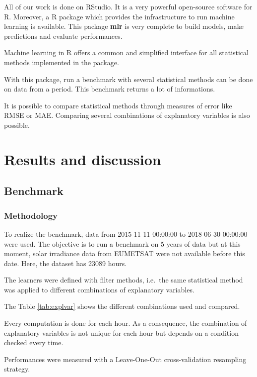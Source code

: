 \documentclass[12pt,twoside]{reedthesis}
\theoremstyle{definition}
\theoremstyle{definition}
\theoremstyle{definition}
\theoremstyle{remark}
\begin{document}
All of our work is done on RStudio. It is a very powerful open-source
software for R. Moreover, a R package which provides the infrastructure
to run machine learning is available. This package \textbf{mlr} is very
complete to build models, make predictions and evaluate performances.

Machine learning in R offers a common and simplified interface for all
statistical methods implemented in the package.

With this package, run a benchmark with several statistical methods can
be done on data from a period. This benchmark returns a lot of
informations.

It is possible to compare statistical methods through measures of error
like RMSE or MAE. Comparing several combinations of explanatory
variables is also possible.

\chapter{Results and discussion}\label{results}

\section{Benchmark}\label{benchmark}

\subsection{Methodology}\label{methodology}

To realize the benchmark, data from 2015-11-11 00:00:00 to 2018-06-30
00:00:00 were used. The objective is to run a benchmark on 5 years of
data but at this moment, solar irradiance data from EUMETSAT were not
available before this date. Here, the dataset has 23089 hours.

The learners were defined with filter methods, i.e.~the same statistical
method was applied to different combinations of explanatory variables.

The Table \ref{tab:explvar} shows the different combinations used and
compared.

Every computation is done for each hour. As a consequence, the
combination of explanatory variables is not unique for each hour but
depends on a condition checked every time.

Performances were measured with a Leave-One-Out cross-validation
resampling strategy.
\end{document}
